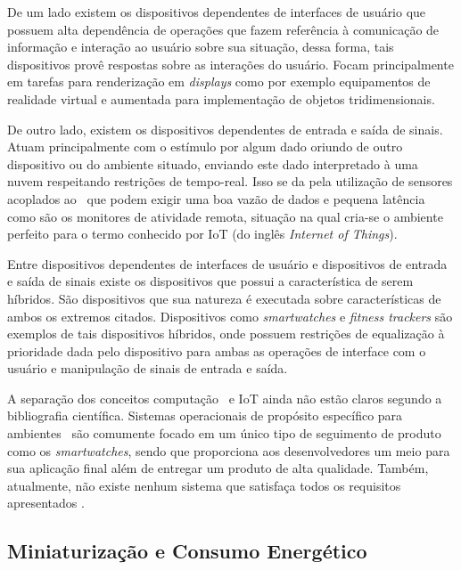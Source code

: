         De um lado existem os dispositivos dependentes de interfaces de usuário que possuem alta dependência de operações que fazem referência à comunicação de informação e interação ao usuário sobre sua situação, dessa forma, tais dispositivos provê respostas sobre as interações do usuário.
        Focam principalmente em tarefas para renderização em \textit{displays} como por exemplo equipamentos de realidade virtual e aumentada para implementação de objetos tridimensionais.
        
        De outro lado, existem os dispositivos dependentes de entrada e saída de sinais. 
        Atuam principalmente com o estímulo por algum dado oriundo de outro dispositivo ou do ambiente situado, enviando este dado interpretado à uma nuvem respeitando restrições de tempo-real.
        Isso se da pela utilização de sensores acoplados ao \wearable\ que podem exigir uma boa vazão de dados e pequena latência como são os monitores de atividade remota, situação na qual cria-se o ambiente perfeito para o termo conhecido por IoT (do inglês \textit{Internet of Things}).
        
        Entre dispositivos dependentes de interfaces de usuário e dispositivos de entrada e saída de sinais existe os dispositivos que possui a característica de serem híbridos. 
        São dispositivos que sua natureza é executada sobre características de ambos os extremos citados.
        Dispositivos como \textit{smartwatches} e \textit{fitness trackers} são exemplos de tais dispositivos híbridos, onde possuem restrições de equalização à prioridade dada pelo dispositivo para ambas as operações de interface com o usuário e manipulação de sinais de entrada e saída.
        
        A separação dos conceitos computação \wearable\ e IoT ainda não estão claros segundo a bibliografia científica.
        Sistemas operacionais de propósito específico para ambientes \wearable\ são comumente focado em um único tipo de seguimento de produto como os \textit{smartwatches}, sendo que proporciona aos desenvolvedores um meio para sua aplicação final além de entregar um produto de alta qualidade.
        Também, atualmente, não existe nenhum sistema que satisfaça todos os requisitos apresentados \citep{Amorim2017}.
        
        

    
    \subsection{Miniaturização e Consumo Energético}
    
